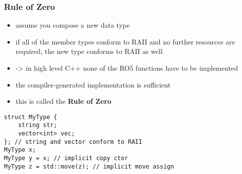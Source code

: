 \begin{frame}[fragile]
    \frametitle{Rule of Zero}
    \begin{itemize}
        \item assume you compose a new data type
        \item if all of the member types conform to RAII and no further resources are required, the new type conforms to RAII as well
        \item -> in high level C++ none of the RO5 functions have to be implemented
        \item the compiler-generated implementation is sufficient
        \item this is called the \textbf{Rule of Zero}
    \end{itemize}
    \begin{lstlisting}[numbers=none]
struct MyType {
    string str;
    vector<int> vec;
}; // string and vector conform to RAII
MyType x;
MyType y = x; // implicit copy ctor
MyType z = std::move(z); // implicit move assign
    \end{lstlisting}
\end{frame}


